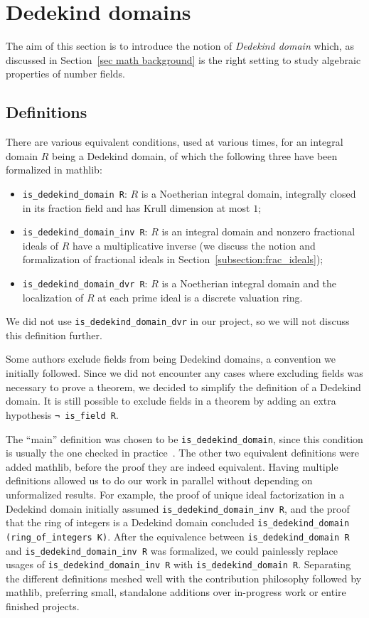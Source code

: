 \documentclass[a4paper,USenglish,cleveref, autoref, thm-restate]{lipics-v2021}
\newcommand{\lean}[1]{\texttt{#1}\xspace} %
\newcommand{\mathlib}{\textsf{mathlib}\xspace}
\begin{document}
\section{Dedekind domains} \label{sec:Dedekind-domain}
The aim of this section is to introduce the notion of \emph{Dedekind domain} which, as discussed in Section~\ref{sec math background} is the right setting to study algebraic properties of number fields.
\subsection{Definitions}\label{subsec:definitions_DD}
There are various equivalent conditions, used at various times, for an integral domain $R$ being a Dedekind domain,
of which the following three have been formalized in \mathlib:
\begin{itemize}
\item \lean{is\_dedekind\_domain R}: $R$ is a Noetherian integral domain, integrally closed in its fraction field and has Krull dimension at most $1$;
\item \lean{is\_dedekind\_domain\_inv R}: $R$ is an integral domain and nonzero fractional ideals of $R$ have a multiplicative inverse (we discuss the notion and formalization of fractional ideals in Section~\ref{subsection:frac_ideals});
\item \lean{is\_dedekind\_domain\_dvr R}: $R$ is a Noetherian integral domain and the localization of $R$ at each prime ideal is a discrete valuation ring.
\end{itemize}
We did not use \lean{is\_dedekind\_domain\_dvr} in our project, so we will not discuss this definition further.

Some authors exclude fields from being Dedekind domains, a convention we initially followed.
Since we did not encounter any cases where excluding fields was necessary to prove a theorem,
we decided to simplify the definition of a Dedekind domain.
It is still possible to exclude fields in a theorem by adding an extra hypothesis \lean{¬ is\_field R}.

The ``main'' definition was chosen to be \lean{is\_dedekind\_domain},
since this condition is usually the one checked in practice~\cite{Neukirch}.
The other two equivalent definitions were added \mathlib, before the proof they are indeed equivalent.
Having multiple definitions allowed us to do our work in parallel without depending on unformalized results.
For example,
the proof of unique ideal factorization in a Dedekind domain initially assumed \lean{is\_dedekind\_domain\_inv R},
and the proof that the ring of integers is a Dedekind domain concluded \lean{is\_dedekind\_domain (ring\_of\_integers K)}.
After the equivalence between \lean{is\_dedekind\_domain R} and \lean{is\_dedekind\_domain\_inv R} was formalized,
we could painlessly replace usages of \lean{is\_dedekind\_domain\_inv R} with \lean{is\_dedekind\_domain R}.
Separating the different definitions meshed well with the contribution philosophy followed by \mathlib, preferring small, standalone additions over in-progress work or entire finished projects.
\end{document}
